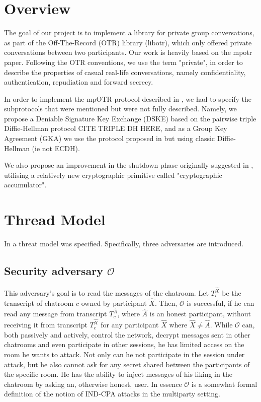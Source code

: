 \documentclass[12pt,titlepage,a4paper]{article}
\begin{document}
\tableofcontents
\newpage
{
\section{Overview}
The goal of our project is to implement a library for private group conversations, as part of the Off-The-Record (OTR) library (libotr), which only offered private conversations between two participants. Our work is heavily based on the mpotr \cite{mpotr} paper. Following the OTR conventions, we use the term "private", in order to describe the properties of casual real-life conversations, namely confidentiality, authentication, repudiation and forward secrecy.

In order to implement the mpOTR protocol described in \cite{mpotr}, we had to specify the subprotocols that were mentioned but were not fully described. Namely, we propose a Deniable Signature Key Exchange (DSKE) based on the pairwise triple Diffie-Hellman protocol CITE TRIPLE DH HERE, and as a  Group Key Agreement (GKA) we use the protocol proposed in \cite{mpenc} but using classic Diffie-Hellman (ie not ECDH).

We also propose an improvement in the shutdown phase originally suggested in \cite{mpotr},
utilising a relatively new cryptographic primitive called "cryptographic accumulator".

\section{Thread Model}
\label{threat_model}
In \cite{mpotr} a threat model was specified. Specifically, three adversaries are introduced.

\subsection{Security adversary $\mathcal{O}$}
This adversary's goal is to read the messages of the chatroom.
Let $T_c^{\hat{X}}$ be the transcript of chatroom $c$ owned by participant $\hat{X}$.
Then, $\mathcal{O}$ is successful, if he can read any message from transcript $T_c^{\hat{A}}$, where $\hat{A}$ is an honest participant, without receiving it from transcript $T_c^{\hat{X}}$ for any participant $\hat{X}$ where $\hat{X} \ne \hat{A}$.
While $\mathcal{O}$ can, both passively and actively, control the network, decrypt messages sent in other chatrooms and even participate in other sessions, he has limited access on the room he wants to attack.
Not only can he not participate in the session under attack, but he also cannot ask for any secret shared between the participants of the specific room.
He has the ability to inject messages of his liking in the chatroom by asking an, otherwise honest, user.
In essence $\mathcal{O}$ is a somewhat formal definition of the notion of IND-CPA attacks in the multiparty setting.

}
\end{document}
